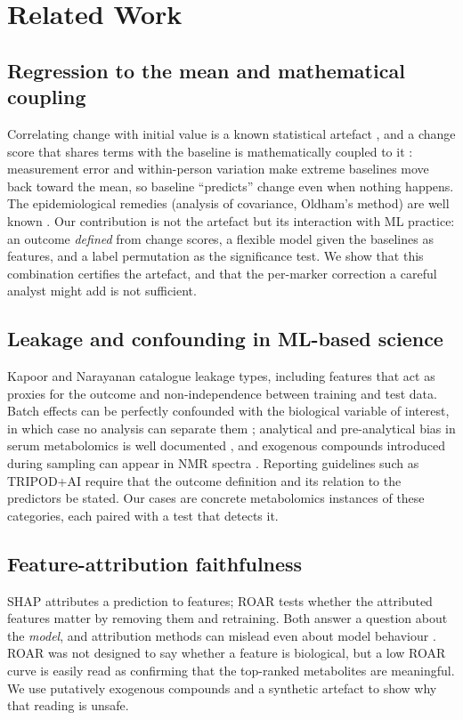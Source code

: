 \documentclass[conference]{IEEEtran}
\begin{document}
\section{Related Work}
\label{sec:related}

\subsection{Regression to the mean and mathematical coupling}
Correlating change with initial value is a known statistical artefact
\cite{oldham1962, tu2007, barnett2005}, and a change score that shares terms
with the baseline is mathematically coupled to it \cite{archie1981}:
measurement error and within-person variation make extreme baselines move
back toward the mean, so baseline ``predicts'' change even when nothing
happens. The epidemiological remedies (analysis of covariance, Oldham's
method) are well known \cite{vickers2001, glymour2005}. Our contribution is
not the artefact but its interaction with ML practice: an outcome
\emph{defined} from change scores, a flexible model given the baselines as
features, and a label permutation as the significance test. We show that this
combination certifies the artefact, and that the per-marker correction a
careful analyst might add is not sufficient.

\subsection{Leakage and confounding in ML-based science}
Kapoor and Narayanan \cite{kapoor2023} catalogue leakage types, including
features that act as proxies for the outcome and non-independence between
training and test data. Batch effects can be perfectly confounded with the
biological variable of interest, in which case no analysis can separate them
\cite{leek2010}; analytical and pre-analytical bias in serum metabolomics is
well documented \cite{teahan2006, han2022, bernini2011}, and exogenous
compounds introduced during sampling can appear in NMR spectra
\cite{vandersar2015}. Reporting guidelines such as TRIPOD+AI
\cite{collins2024} require that the outcome definition and its relation to
the predictors be stated. Our cases are concrete metabolomics instances of
these categories, each paired with a test that detects it.

\subsection{Feature-attribution faithfulness}
SHAP \cite{lundberg2017} attributes a prediction to features; ROAR
\cite{hooker2019} tests whether the attributed features matter by removing
them and retraining. Both answer a question about the \emph{model}, and
attribution methods can mislead even about model behaviour
\cite{adebayo2018, kumar2020}. ROAR was not designed to say whether a feature
is biological, but a low ROAR curve is easily read as confirming that the
top-ranked metabolites are meaningful. We use putatively exogenous compounds
and a synthetic artefact to show why that reading is unsafe.
\end{document}
